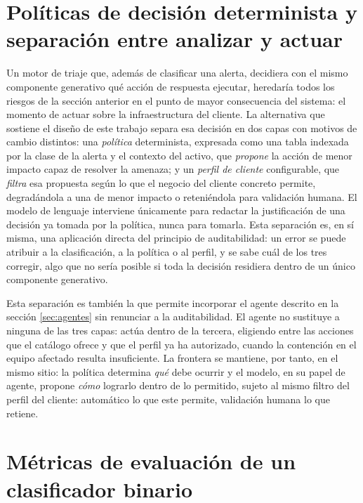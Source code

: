 \section{Políticas de decisión determinista y separación entre analizar y actuar}
\label{sec:politica-perfil}

Un motor de triaje que, además de clasificar una alerta, decidiera con el mismo componente
generativo qué acción de respuesta ejecutar, heredaría todos los riesgos de la sección anterior en
el punto de mayor consecuencia del sistema: el momento de actuar sobre la infraestructura del
cliente. La alternativa que sostiene el diseño de este trabajo separa esa decisión en dos capas con
motivos de cambio distintos: una \emph{política} determinista, expresada como una tabla indexada
por la clase de la alerta y el contexto del activo, que \emph{propone} la acción de menor impacto
capaz de resolver la amenaza; y un \emph{perfil de cliente} configurable, que \emph{filtra} esa
propuesta según lo que el negocio del cliente concreto permite, degradándola a una de menor impacto
o reteniéndola para validación humana. El modelo de lenguaje interviene únicamente para redactar la
justificación de una decisión ya tomada por la política, nunca para tomarla. Esta separación es, en
sí misma, una aplicación directa del principio de auditabilidad: un error se puede atribuir a la
clasificación, a la política o al perfil, y se sabe cuál de los tres corregir, algo que no sería
posible si toda la decisión residiera dentro de un único componente generativo.

Esta separación es también la que permite incorporar el agente descrito en la sección
\ref{sec:agentes} sin renunciar a la auditabilidad. El agente no sustituye a ninguna de las tres
capas: actúa dentro de la tercera, eligiendo entre las acciones que el catálogo ofrece y que el
perfil ya ha autorizado, cuando la contención en el equipo afectado resulta insuficiente. La
frontera se mantiene, por tanto, en el mismo sitio: la política determina \emph{qué} debe ocurrir y
el modelo, en su papel de agente, propone \emph{cómo} lograrlo dentro de lo permitido, sujeto al
mismo filtro del perfil del cliente: automático lo que este permite, validación humana lo que retiene.

\section{Métricas de evaluación de un clasificador binario}

